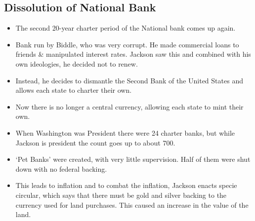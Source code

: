 \documentclass{article}
\begin{document}
      \subsection{Dissolution of National Bank}
        \begin{itemize}
          \item The second 20-year charter period of the National bank comes up again.
          \item Bank run by Biddle, who was very corrupt. He made commercial loans to friends \& manipulated interest rates. Jackson saw this and combined with his own ideologies, he decided not to renew.
          \item Instead, he decides to dismantle the Second Bank of the United States and allows each state to charter their own.
          \item Now there is no longer a central currency, allowing each state to mint their own.
          \item When Washington was President there were 24 charter banks, but while Jackson is president the count goes up to about 700.
          \item `Pet Banks' were created, with very little supervision. Half of them were shut down with no federal backing.
          \item This leads to inflation and to combat the inflation, Jackson enacts specie circular, which says that there must be gold and silver backing to the currency used for land purchases. This caused an increase in the value of the land.
        \end{itemize}
\end{document}
